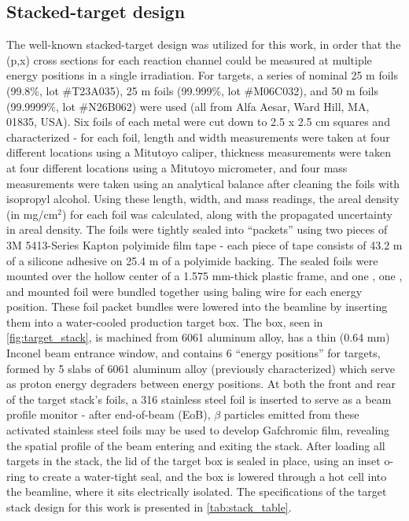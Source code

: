 \documentclass[3p]{elsarticle}
\newcommand{\comment}[1]{\todo[color=blue!20!white,inline]{ASV: #1}}
\begin{document}
\subsection{Stacked-target design }\label{sec:target_design}


The well-known stacked-target design was utilized for this work, in order that the (p,x) cross sections for each reaction channel could be measured at multiple energy positions in a single irradiation. 
For targets, a series of nominal 25 \micro m  foils (99.8\%, lot \#T23A035), 25 \micro m  foils (99.999\%, lot \#M06C032), and 50 \micro m  foils (99.9999\%, lot \#N26B062) were used (all from Alfa Aesar, Ward Hill, MA, 01835, USA).
Six foils of each metal were cut down to 2.5 x 2.5 cm squares and characterized - for each foil, length and width measurements were taken at four different locations using a Mitutoyo caliper, thickness measurements were taken at four different locations using a Mitutoyo micrometer, and four mass measurements were taken using an analytical balance after cleaning the foils with isopropyl alcohol.
Using these length, width, and mass readings, the areal density (in mg/cm$^2$) for each foil was calculated, along with the propagated uncertainty in areal density.
The foils were tightly sealed into \enquote{packets} using two pieces of  3M 5413-Series Kapton polyimide film tape - each piece of tape consists of 43.2 \micro m of a silicone adhesive on 25.4 \micro m of a polyimide backing.
The sealed foils were mounted over the hollow center of a 1.575 mm-thick plastic frame, and one , one , and  mounted foil were bundled together using baling wire for each energy position.
These foil packet bundles were lowered into the beamline by inserting them into a  water-cooled production target box.
The box, seen in \autoref{fig:target_stack}, is machined from 6061 aluminum alloy, has a thin (0.64 mm) Inconel beam entrance window, and  contains 6 \enquote{energy positions} for targets, formed by  5 slabs of 6061 aluminum alloy (previously characterized) which serve as proton energy degraders  between energy positions.
At both the front and rear of the target stack's foils, a 316 stainless steel foil is inserted to serve as a beam profile monitor - after end-of-beam (EoB), $\beta$ particles emitted from these activated stainless steel foils may be used to develop Gafchromic film, revealing the spatial profile of the beam entering and exiting the stack.
After loading all targets in the stack, the lid of the target box is sealed in place, using an inset o-ring to create a water-tight seal, and the box is lowered through a hot cell into the beamline, where it sits electrically isolated.
The specifications of the target stack design for this work is presented in \autoref{tab:stack_table}.
\end{document}
